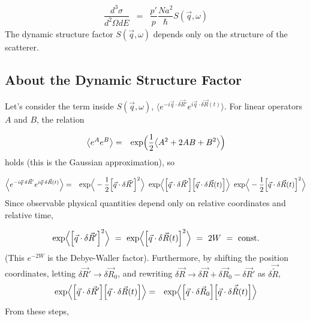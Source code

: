 \documentclass[a4j]{jsarticle}
\begin{document}
\begin{eqnarray}
	\dfrac{ d^{3} \sigma }{ d^{2} \Omega d E }
	&=&
	\dfrac{p'}{p}
	\dfrac{ N a^{2} }{ \hbar }
	S(\vec{q},\omega)
\end{eqnarray}
The dynamic structure factor $S(\vec{q},\omega)$ depends only on the structure of the scatterer.
\subsection*{About the Dynamic Structure Factor}

Let's consider the term inside $S(\vec{q},\omega)$,
$\big\langle e^{ - i \vec{q} \cdot \delta \vec{R}' } e^{i \vec{q} \cdot \delta \vec{R}(t) } \big\rangle$.
For linear operators $A$ and $B$, the relation

\begin{eqnarray}
	\big\langle e^{ A } e^{ B } \big\rangle
	&=&
	{\rm exp} \Big( \dfrac{1}{2} \big\langle A^{2} + 2 AB + B^{2} \big\rangle \Big)
\end{eqnarray}
holds (this is the Gaussian approximation), so

\begin{eqnarray}
	\Big\langle e^{ - i \vec{q} \cdot \delta \vec{R}' } e^{i \vec{q} \cdot \delta \vec{R}(t) } \Big\rangle
	&=&
	{\rm exp} \Big\langle - \dfrac{1}{2} \Big[ \vec{q} \cdot \delta \vec{R}' \Big]^{2} \Big\rangle
	\ \ \!
	{\rm exp} \Big\langle \Big[ \vec{q} \cdot \delta \vec{R}' \Big] \Big[ \vec{q} \cdot \delta \vec{R}(t) \Big] \Big\rangle
	\ \ \!
	{\rm exp} \Big\langle - \dfrac{1}{2} \Big[ \vec{q} \cdot \delta \vec{R}(t) \Big]^{2} \Big\rangle
	\nonumber \\
\end{eqnarray}
Since observable physical quantities depend only on relative coordinates and relative time,

\begin{eqnarray}
	{\rm exp} \Big\langle \Big[ \vec{q} \cdot \delta \vec{R}' \Big]^{2} \Big\rangle
	\ = \
	{\rm exp} \Big\langle \Big[ \vec{q} \cdot \delta \vec{R}(t) \Big]^{2} \Big\rangle
	\ = \
	2W
	\ = \
	{\rm const.}
\end{eqnarray}
(This $e^{-2W}$ is the Debye-Waller factor).
Furthermore, by shifting the position coordinates,
letting $ \delta \vec{R}' \to \delta \vec{R}_{0}$,
and rewriting
$\delta \vec{R} \to \delta \vec{R} + \delta \vec{R}_{0} - \delta \vec{R}'$
as
$\delta \vec{\tilde{R}}$,
\begin{eqnarray}
	{\rm exp} \Big\langle \Big[ \vec{q} \cdot \delta \vec{R}' \Big] \Big[ \vec{q} \cdot \delta \vec{R}(t) \Big] \Big\rangle
	&=&
	{\rm exp} \Big\langle \Big[ \vec{q} \cdot \delta \vec{R}_{0} \Big] \Big[ \vec{q} \cdot \delta \vec{\tilde{R}}(t) \Big] \Big\rangle
\end{eqnarray}
From these steps,
\end{document}
